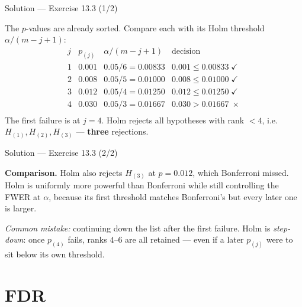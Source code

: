 \documentclass[aspectratio=169,11pt]{beamer}
\begin{document}
\begin{frame}{Solution --- Exercise 13.3 (1/2)}
\begin{solutionbox}
  The $p$-values are already sorted. Compare each with its Holm
  threshold $\alpha / (m - j + 1)$:
  \[
    \begin{array}{c|c|c|c}
      j & p_{(j)} & \alpha/(m-j+1) & \text{decision} \\ \hline
      1 & 0.001 & 0.05/6 = 0.00833 & 0.001 \le 0.00833 \;\checkmark \\
      2 & 0.008 & 0.05/5 = 0.01000 & 0.008 \le 0.01000 \;\checkmark \\
      3 & 0.012 & 0.05/4 = 0.01250 & 0.012 \le 0.01250 \;\checkmark \\
      4 & 0.030 & 0.05/3 = 0.01667 & 0.030 > 0.01667 \;\times \\
    \end{array}
  \]
  The first failure is at $j = 4$. Holm rejects all hypotheses with
  rank $< 4$, i.e. $H_{(1)}, H_{(2)}, H_{(3)}$ --- \textbf{three}
  rejections.
\end{solutionbox}
\end{frame}

\begin{frame}{Solution --- Exercise 13.3 (2/2)}
\begin{solutionbox}
  \medskip
  \textbf{Comparison.} Holm also rejects $H_{(3)}$ at $p = 0.012$,
  which Bonferroni missed. Holm is uniformly more powerful than
  Bonferroni while still controlling the FWER at $\alpha$, because its
  first threshold matches Bonferroni's but every later one is larger.

  \medskip
  \textit{Common mistake:} continuing down the list after the first
  failure. Holm is \emph{step-down}: once $p_{(4)}$ fails, ranks $4$--$6$
  are all retained --- even if a later $p_{(j)}$ were to sit below its own
  threshold.
\end{solutionbox}
\end{frame}

\section{FDR}
\end{document}
